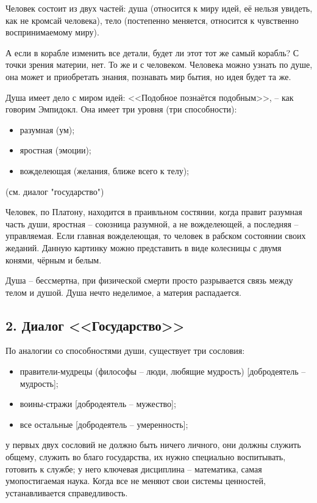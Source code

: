 \documentclass[a4paper, 12pt]{article} %
\begin{document}
Человек состоит из двух частей: душа (относится к миру идей, её нельзя увидеть, как не кромсай человека), тело (постепенно меняется, относится к чувственно воспринимаемому миру).

А если в корабле изменить все детали, будет ли этот тот же самый корабль? С точки зрения материи, нет. То же и с человеком. Человека можно узнать по душе, она может и приобретать знания, познавать мир бытия, но идея будет та же.

Душа имеет дело с миром идей: <<Подобное познаётся подобным>>, -- как говорим Эмпидокл. Она имеет три уровня (три способности):
\begin{itemize}
\item разумная (ум);
\item яростная (эмоции); 
\item вожделеющая (желания, ближе всего  к телу);
\end{itemize}
(см. диалог "государство")

Человек, по Платону, находится в праивльном состянии, когда правит разумная часть души, яростная -- союзница разумной, а не вожделеющей, а последняя -- управляемая.
Если главная вожделеющая, то человек в рабском состоянии своих жеданий.
Данную картинку можно представить в виде колесницы с двумя конями, чёрным и белым.

Душа -- бессмертна, при физической смерти просто разрывается связь между телом и душой. Душа нечто неделимое, а материя распадается.

\subsection*{2. Диалог <<Государство>>}
По аналогии со способностями души, существует три сословия:
\begin{itemize}
\item правители-мудрецы (философы -- люди, любящие мудрость) [добродеятель -- мудрость];
\item воины-стражи [добродеятель -- мужество];
\item все остальные [добродеятель -- умеренность];
\end{itemize} 

у первых двух сословий не должно быть ничего личного, они должны служить общему, служить во благо государства, их нужно специально воспитывать, готовить к службе;
у него ключевая дисциплина -- математика, самая умопостигаемая наука. 
Когда все не меняют свои системы ценностей, устанавливается справедливость.
\end{document}

